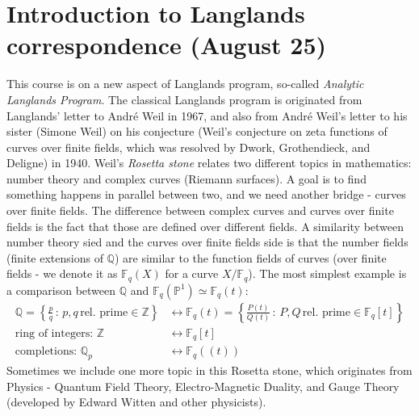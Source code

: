 \newpage
\section{Introduction to Langlands correspondence (August 25)}

This course is on a new aspect of Langlands program, so-called \emph{Analytic Langlands Program}.
The classical Langlands program is originated from Langlands' letter to Andr\'e Weil in 1967,
and also from Andr\'e Weil's letter to his sister  (Simone Weil) on his conjecture (Weil's conjecture on
zeta functions of curves over finite fields, which was resolved by Dwork, Grothendieck, and Deligne) in 1940.
Weil's \emph{Rosetta stone} relates two different topics in mathematics: number theory and complex curves (Riemann surfaces).
A goal is to find something happens in parallel between two, and we need another bridge - curves over finite fields.
The difference between complex curves and curves over finite fields is the fact that those are defined over different fields.
A similarity between number theory sied and the curves over finite fields side is that 
the number fields (finite extensions of $\mathbb{Q}$) are similar to the function fields of curves (over finite fields - we denote it as $\mathbb{F}_{q}(X)$ for a curve $X/\mathbb{F}_{q}$).
The most simplest example is a comparison between $\mathbb{Q}$ and $\mathbb{F}_{q}(\mathbb{P}^{1}) \simeq \mathbb{F}_{q}(t)$:
\begin{align*}
    \mathbb{Q} = \left\{ \frac{p}{q}\,:\,p, q\,\text{rel. prime} \in \mathbb{Z}\right\} &\leftrightarrow \mathbb{F}_{q}(t) = \left\{ \frac{P(t)}{Q(t)}\,:\, P, Q\,\text{rel. prime} \in \mathbb{F}_{q}[t]\right\} \\
    \text{ring of integers: }\mathbb{Z} &\leftrightarrow \mathbb{F}_{q}[t] \\
    \text{completions: }\mathbb{Q}_{p} &\leftrightarrow \mathbb{F}_{q}((t))
\end{align*}
Sometimes we include one more topic in this Rosetta stone, which originates from Physics -
Quantum Field Theory, Electro-Magnetic Duality, and Gauge Theory (developed by Edward Witten and other physicists).

